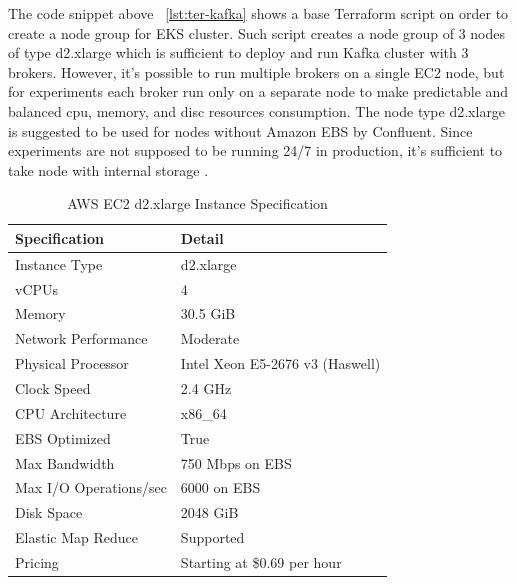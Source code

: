 The code snippet above ~\ref{lst:ter-kafka} shows a base Terraform script on order to create
a node group for EKS cluster.
Such script creates a node group of 3 nodes of type d2.xlarge which is sufficient to deploy and run
Kafka cluster with 3 brokers.
However, it's possible to run multiple brokers on a single EC2 node, but for experiments
each broker run only on a separate node to make predictable and balanced cpu, memory, and disc
resources consumption.
The node type d2.xlarge is suggested to be used for nodes without Amazon EBS by Confluent.
Since experiments are not supposed to be running 24/7 in production, it's sufficient to take node
with internal storage \cite{confluent2023}.


\begin{table}[h]
    \centering
    \begin{tabular}{@{}ll@{}}
        \toprule
        Specification          & Detail                       \\ \midrule
        Instance Type          & d2.xlarge                    \\
        vCPUs                  & 4                            \\
        Memory                 & 30.5 GiB                     \\
        Network Performance    & Moderate                     \\
        Physical Processor     & Intel Xeon E5-2676 v3 (Haswell) \\
        Clock Speed            & 2.4 GHz                      \\
        CPU Architecture       & x86\_64                      \\
        EBS Optimized          & True                         \\
        Max Bandwidth          & 750 Mbps on EBS              \\
        Max I/O Operations/sec & 6000 on EBS                  \\
        Disk Space             & 2048 GiB                     \\
        Elastic Map Reduce     & Supported                    \\
        Pricing                & Starting at \$0.69 per hour  \\ \bottomrule
    \end{tabular}
    \caption{AWS EC2 d2.xlarge Instance Specification}
    \label{tab:d2_xlarge_spec}
\end{table}

